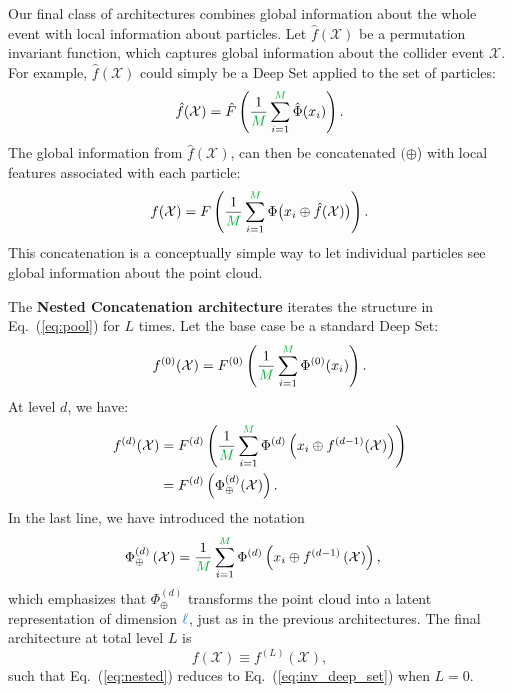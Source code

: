 \documentclass[aps,prd,twocolumn,superscriptaddress,floatfix,longbibliography,preprintnumbers,nofootinbib]{revtex4-1} %
\DeclareRobustCommand{\Eq}[1]{Eq.~(\ref{eq:#1})}
\begin{document}
 Our final class of architectures combines global information about the whole event with local information about particles.
 Let $\hat f(\mathcal X)$ be a permutation invariant function, which captures global information about the collider event $\mathcal X$.
 For example, $\hat f(\mathcal X)$ could simply be a Deep Set applied to the set of particles:
%
      \begin{equation}
        \hat f(\mathcal X) = \hat{F}\left( \frac{1}{{\color{c2}M}}\sum_{i=1}^{{\color{c2} M}}\hat{\Phi}(x_i) \right).
      \end{equation}
%
The global information from $\hat f(\mathcal X)$, can then be concatenated $(\oplus$) with local features associated with each particle:
%
      \begin{equation}
        f(\mathcal X) = F \left( \frac{1}{{\color{c2}M}}\sum_{i=1}^{{\color{c2} M}} \Phi\big(x_i\oplus \hat f(\mathcal X) \big) \right).
      \label{eq:pool}
      \end{equation}
%  
This concatenation is a conceptually simple way to let individual particles see global information about the point cloud.


The \textbf{Nested Concatenation architecture} iterates the structure in \Eq{pool} for $L$ times.
%
Let the base case be a standard Deep Set:
%
      \begin{equation}
        f^{(0)}(\mathcal X) = F^{(0)} \left(\frac{1}{{\color{c2}M}} \sum_{i=1}^{{\color{c2}M}} \Phi^{(0)}(x_i) \right).
        \label{eq:nested_base}
      \end{equation}
%
At level $d$, we have:
        \begin{align}
          \nonumber
          f^{(d)}(\mathcal X)&= F^{(d)} \left( \frac{1}{{\color{c2}M}}\sum_{i=1}^{{\color{c2} M}} \Phi^{(d)} \left( x_i \oplus f^{(d-1)}(\mathcal X) \right)  \right) \\
                             &= F^{(d)} \left( \Phi^{(d)}_\oplus(\mathcal X) \right).
        \label{eq:nested}
        \end{align}
        In the last line, we have introduced the notation 
        \begin{align}
          \Phi_\oplus^{(d)} \left(\mathcal X  \right) &= \frac{1}{{\color{c2}M}}\sum_{i=1}^{{\color{c2}M}} \Phi^{(d)} \left( x_i \oplus f^{(d-1)}\left( \mathcal X \right)  \right),
          \label{eq:phioplus}
        \end{align}
        which emphasizes that $\Phi_\oplus^{(d)}$ transforms the point cloud into a latent representation of dimension ${{\color{c3}\ell}}$, just as in the previous architectures.
        The final architecture at total level $L$ is
      \begin{equation}
      f(\mathcal X) \equiv f^{(L)}(\mathcal X),
      \end{equation}
%
such that \Eq{nested} reduces to \Eq{inv_deep_set} when $L = 0$.
\end{document}
